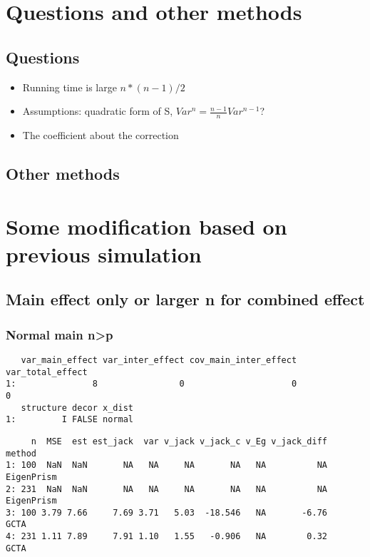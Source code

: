 \documentclass[]{article}
\providecommand{\tightlist}{%
  \setlength{\itemsep}{0pt}\setlength{\parskip}{0pt}}
\begin{document}
\section{Questions and other methods}\label{questions-and-other-methods}

\subsection{Questions}\label{questions}

\begin{itemize}
\tightlist
\item
  Running time is large \(n*(n-1)/2\)
\item
  Assumptions: quadratic form of S, \(Var^n = \frac{n-1}{n}Var^{n-1}\)?
\item
  The coefficient about the correction
\end{itemize}

\subsection{Other methods}\label{other-methods}

\section{Some modification based on previous
simulation}\label{some-modification-based-on-previous-simulation}

\subsection{Main effect only or larger n for combined
effect}\label{main-effect-only-or-larger-n-for-combined-effect}

\subsubsection{Normal main n\textgreater{}p}\label{normal-main-np}

\begin{verbatim}
   var_main_effect var_inter_effect cov_main_inter_effect var_total_effect
1:               8                0                     0                0
   structure decor x_dist
1:         I FALSE normal
\end{verbatim}

\begin{verbatim}
     n  MSE  est est_jack  var v_jack v_jack_c v_Eg v_jack_diff     method
1: 100  NaN  NaN       NA   NA     NA       NA   NA          NA EigenPrism
2: 231  NaN  NaN       NA   NA     NA       NA   NA          NA EigenPrism
3: 100 3.79 7.66     7.69 3.71   5.03  -18.546   NA       -6.76       GCTA
4: 231 1.11 7.89     7.91 1.10   1.55   -0.906   NA        0.32       GCTA
\end{verbatim}
\end{document}
